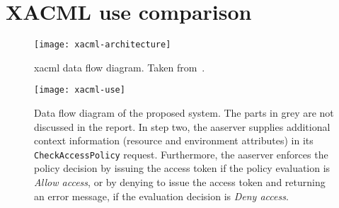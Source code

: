 \section{XACML use comparison}\label{sec:xacml-use}

\begin{figure}[ht]
    \centering
    \texttt{[image: xacml-architecture]}
    \caption{\acrshort{xacml} data flow diagram. Taken from~\cite{OASISStandard2013EXtensible3.0}.}
    \label{fig:xacml-architecture}
\end{figure}

\begin{sidewaysfigure}[ht]
    \centering
    \texttt{[image: xacml-use]}
    \caption{Data flow diagram of the proposed system. The parts in grey are not discussed in the report. In step two, the \acrshort{aaserver} supplies additional context information (resource and environment attributes) in its \texttt{CheckAccessPolicy} request. Furthermore, the \acrshort{aaserver} enforces the policy decision by issuing the access token if the policy evaluation is \textit{Allow access}, or by denying to issue the access token and returning an error message, if the evaluation decision is \textit{Deny access}.}
    \label{fig:xacml-use}
\end{sidewaysfigure}